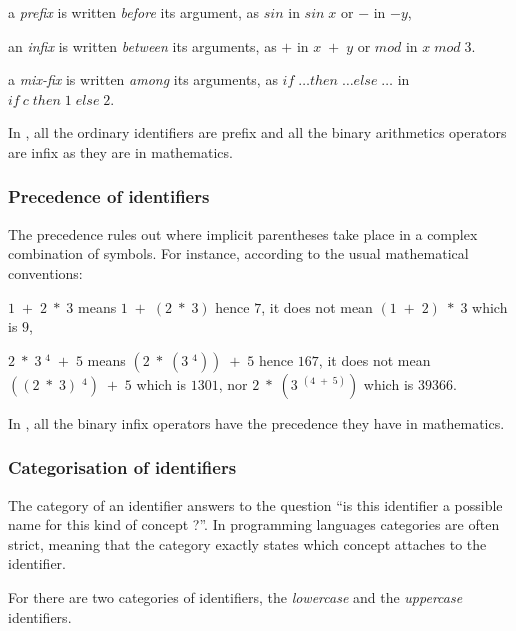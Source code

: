 \begin{citemize}
\item a {\em prefix} is written {\em before} its argument, as $sin$ in
 $sin\; x$ or $-$ in $- y$,
\item an {\em infix} is written {\em between} its arguments, as $+$ in
 $x\; +\; y$ or $mod$ in $x\; mod \;3$.
\item a {\em mix-fix} is written {\em among} its arguments, as
  $if\; \ldots then\; \ldots else\; \ldots$ in
  $if\ c\; then\; 1\; else\; 2 $.
\end{citemize}

In {\focal}, all the ordinary identifiers are prefix and all the binary
arithmetics operators are infix as they are in mathematics.

\subsubsection{Precedence of identifiers}

The precedence rules out where implicit parentheses take place in a
complex combination of symbols. For instance, according to the usual mathematical
conventions:
\begin{citemize}
\item $1\; +\; 2\; *\; 3$  means $1\; +\; (2\; *\; 3)$ hence $7$,
      it does not mean $(1\; +\; 2)\; *\; 3$ which is $9$,
\item $2\; *\; 3\; ^4\; +\; 5$ means
      $(2\; *\; (3\; ^4))\; +\; 5$ hence $167$, it does not mean
      $((2\; *\; 3)\; ^4)\; +\; 5$ which is $1301$,
      nor $2\; *\; (3\; ^{(4\; +\; 5)})$ which is $39366$.
\end{citemize}

In {\focal}, all the binary infix operators have the precedence they have in mathematics.

\subsubsection{Categorisation of identifiers}

The category of an identifier answers to the question ``is this identifier a
possible name for this kind of concept ?''.
In programming languages categories are often strict, meaning that the category
exactly states which concept attaches to the identifier.

For {\focal} there are two categories of identifiers, the {\em lowercase} and
the {\em uppercase} identifiers.

